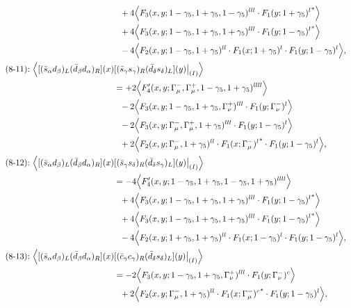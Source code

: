 \begin{align}
\notag\\*&\ \ 
 + 4\Big\langle F_3(x,y;1-\gamma_5,1+\gamma_5,1-\gamma_5)^{lll} \cdot {F_1(y;1+\gamma_5)^l}^*\Big\rangle
\notag\\*&\ \ 
 + 4\Big\langle F_3(x,y;1-\gamma_5,1+\gamma_5,1+\gamma_5)^{lll} \cdot {F_1(y;1-\gamma_5)^l}^*\Big\rangle
\notag\\*&\ \ 
-4\Big\langle F_2(x,y;1-\gamma_5,1+\gamma_5)^{ll} \cdot F_1(x;1+\gamma_5)^l \cdot F_1(y;1-\gamma_5)^l\Big\rangle,
\\
\mbox{(8-11):}\ 
\Big\langle
[(\bar s_\alpha d_\beta)_L(\bar d_\beta d_\alpha)_R](x)&
[(\bar s_\gamma s_\gamma)_R(\bar d_\delta s_\delta)_L](y)\big|_{(I)}
\Big\rangle
\notag\\*
&=
 + 2\Big\langle F_4'(x,y;\Gamma_\mu^-,\Gamma_\mu^+,1-\gamma_5,1+\gamma_5)^{llll}\Big\rangle
\notag\\*&\ \ 
-2\Big\langle F_3(x,y;1-\gamma_5,1+\gamma_5,\Gamma_\nu^+)^{lll} \cdot F_1(y;\Gamma_\nu^-)^l\Big\rangle
\notag\\*&\ \ 
-2\Big\langle F_3(x,y;\Gamma_\mu^-,\Gamma_\mu^+,1+\gamma_5)^{lll} \cdot F_1(y;1-\gamma_5)^l\Big\rangle
\notag\\*&\ \ 
 + 2\Big\langle F_2(x,y;\Gamma_\mu^-,1+\gamma_5)^{ll} \cdot {F_1(x;\Gamma_\mu^-)^l}^* \cdot F_1(y;1-\gamma_5)^l\Big\rangle,
\\
\mbox{(8-12):}\ 
\Big\langle
[(\bar s_\alpha d_\beta)_L(\bar d_\beta d_\alpha)_R](x)&
[(\bar s_\gamma s_\delta)_R(\bar d_\delta s_\gamma)_L](y)\big|_{(I)}
\Big\rangle
\notag\\*
&=
-4\Big\langle F_4'(x,y;1-\gamma_5,1+\gamma_5,1-\gamma_5,1+\gamma_5)^{llll}\Big\rangle
\notag\\*&\ \ 
 + 4\Big\langle F_3(x,y;1-\gamma_5,1+\gamma_5,1+\gamma_5)^{lll} \cdot {F_1(y;1-\gamma_5)^l}^*\Big\rangle
\notag\\*&\ \ 
 + 4\Big\langle F_3(x,y;1-\gamma_5,1+\gamma_5,1+\gamma_5)^{lll} \cdot {F_1(y;1-\gamma_5)^l}^*\Big\rangle
\notag\\*&\ \ 
-4\Big\langle F_2(x,y;1+\gamma_5,1+\gamma_5)^{ll} \cdot F_1(x;1-\gamma_5)^l \cdot F_1(y;1-\gamma_5)^l\Big\rangle,
\\
\mbox{(8-13):}\ 
\Big\langle
[(\bar s_\alpha d_\beta)_L(\bar d_\beta d_\alpha)_R](x)&
[(\bar c_\gamma c_\gamma)_R(\bar d_\delta s_\delta)_L](y)\big|_{(I)}
\Big\rangle
\notag\\*
&=
-2\Big\langle F_3(x,y;1-\gamma_5,1+\gamma_5,\Gamma_\nu^+)^{lll} \cdot F_1(y;\Gamma_\nu^-)^c\Big\rangle
\notag\\*&\ \ 
 + 2\Big\langle F_2(x,y;\Gamma_\mu^-,1+\gamma_5)^{ll} \cdot {F_1(x;\Gamma_\mu^-)^c}^* \cdot F_1(y;1-\gamma_5)^l\Big\rangle,

\end{align}
